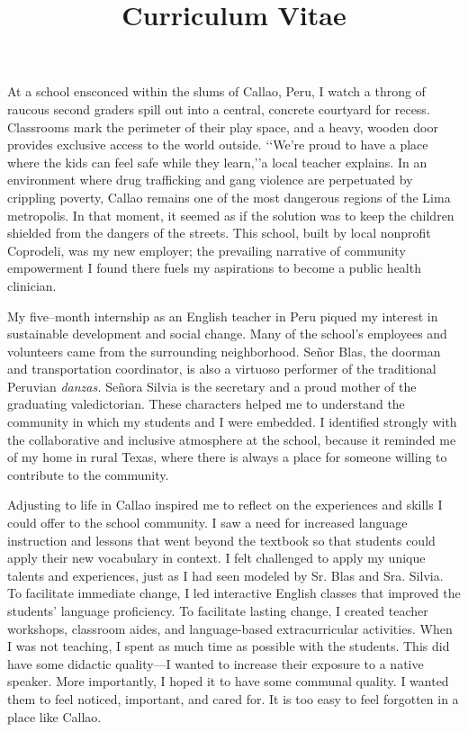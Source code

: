 \documentclass[12pt,a4paper,roman]{moderncv} %
\title{Curriculum Vitae}
\begin{document}


\clearpage


At a school ensconced within the slums of Callao, Peru, I watch a throng of raucous second graders spill out into a central, concrete courtyard for recess. Classrooms mark the perimeter of their play space, and a heavy, wooden door provides exclusive access to the world outside. \lq\lq We're proud to have a place where the kids can feel safe while they learn,\rq\rq\space a local teacher explains. In an environment where drug trafficking and gang violence are perpetuated by crippling poverty, Callao remains one of the most dangerous regions of the Lima metropolis. In that moment, it seemed as if the solution was to keep the children shielded from the dangers of the streets. This school, built by local nonprofit Coprodeli, was my new employer; the prevailing narrative of community empowerment I found there fuels my aspirations to become a public health clinician.

\medskip
 
My five--month internship as an English teacher in Peru piqued my interest in sustainable development and social change. Many of the school's employees and volunteers came from the surrounding neighborhood. Se\~nor Blas, the doorman and transportation coordinator, is also a virtuoso performer of the traditional Peruvian \textit{danzas.} Se\~nora Silvia is the secretary and a proud mother of the graduating valedictorian.  These characters helped me to understand the community in which my students and I were embedded. I identified strongly with the collaborative and inclusive atmosphere at the school, because it reminded me of my home in rural Texas, where there is always a place for someone willing to contribute to the community.

\medskip

Adjusting to life in Callao inspired me to reflect on the experiences and skills I could offer to the school community. I saw a need for increased language instruction and lessons that went beyond the textbook so that students could apply their new vocabulary in context. I felt challenged to apply my unique talents and experiences, just as I had seen modeled by Sr. Blas and Sra. Silvia. To facilitate immediate change, I led interactive English classes that improved the students' language proficiency. To facilitate lasting change, I created teacher workshops, classroom aides, and language-based extracurricular activities.  When I was not teaching, I spent as much time as possible with the students. This did have some didactic quality---I wanted to increase their exposure to a native speaker. More importantly, I hoped it to have some communal quality. I wanted them to feel noticed, important, and cared for. It is too easy to feel forgotten in a place like Callao.
\end{document}
